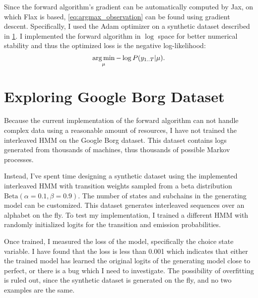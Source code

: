 Since the forward algorithm's gradient can be automatically computed by
Jax\cite{Bradbury2018-jz}, on which Flax is based, \cref{eq:argmax_observation}
can be found using gradient descent. Specifically, I used the
Adam\cite{Kingma2014-jj} optimizer on a synthetic dataset described in
\cref{sec:dataset}. I implemented the forward algorithm in \(\log\) space for
better numerical stability and thus the optimized loss is the negative
log-likelihood:
\begin{equation}
    \label{eq:neg_log_likelihood}
    \operatorname*{arg\,min}_{\mu} - \log P(y_{1..T} | \mu).
\end{equation}

\section{Exploring Google Borg Dataset}\label{sec:dataset}

Because the current implementation of the forward algorithm can not handle
complex data using a reasonable amount of resources, I have not trained the
interleaved HMM on the Google Borg dataset. This dataset contains logs generated
from thousands of machines, thus thousands of possible Markov processes.

Instead, I've spent time designing a synthetic dataset using the implemented
interleaved HMM with transition weights sampled from a beta distribution
\(\text{Beta}(\alpha=0.1, \beta=0.9)\).  The number of states and subchains in
the generating model can be customized. This dataset generates interleaved
sequences over an alphabet on the fly. To test my implementation, I trained a
different HMM with randomly initialized logits for the transition and emission
probabilities.

Once trained, I measured the loss of the model, specifically the choice state
variable. I have found that the loss is less than 0.001 which indicates that
either the trained model has learned the original logits of the generating model
close to perfect, or there is a bug which I need to investigate. The possibility
of overfitting is ruled out, since the synthetic dataset is generated on the
fly, and no two examples are the same.

\printbibliography


